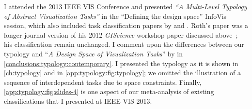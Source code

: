 

    

I attended the 2013 IEEE VIS Conference and presented {\it``A Multi-Level Typology of Abstract Visualization Tasks''} in the ``Defining the design space'' InfoVis session, which also included task classification papers by \citet{Schulz2013} and \citet{Roth2013}.
Roth's paper was a longer journal version of his 2012 {\it GIScience} workshop paper discussed above~\cite{Roth2012}; his classification remain unchanged.
I comment upon the differences between our typology and ``{\it A Design Space of Visualization Tasks}'' by \citet{Schulz2013} in \autoref{conclusions:typology:contemporary}.
I presented the typology as it is shown in \autoref{ch:typology} and in \autoref{app:typology:fig:typology}; we omitted the illustration of a sequence of interdependent tasks due to space constraints.
Finally, \autoref{app:typology:fig:slides-4} is one aspect of our meta-analysis of existing classifications that I presented at IEEE VIS 2013.



